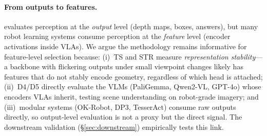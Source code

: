 \paragraph{From outputs to features.}
\coolname{} evaluates perception at the \textit{output} level (depth maps, boxes, answers), but many robot learning systems consume perception at the \textit{feature} level (encoder activations inside VLAs).
We argue the methodology remains informative for feature-level selection because:
(i)~TS and STR measure \textit{representation stability}---a backbone with flickering outputs under small viewpoint changes likely has features that do not stably encode geometry, regardless of which head is attached;
(ii)~D4/D5 directly evaluate the VLMs (PaliGemma, Qwen2-VL, GPT-4o) whose encoders VLAs inherit, testing scene understanding on robot-grade imagery;
and (iii)~modular systems (OK-Robot, DP3, TesserAct) consume raw outputs directly, so output-level evaluation is not a proxy but the direct signal.
The downstream validation (\S\ref{sec:downstream}) empirically tests this link.
